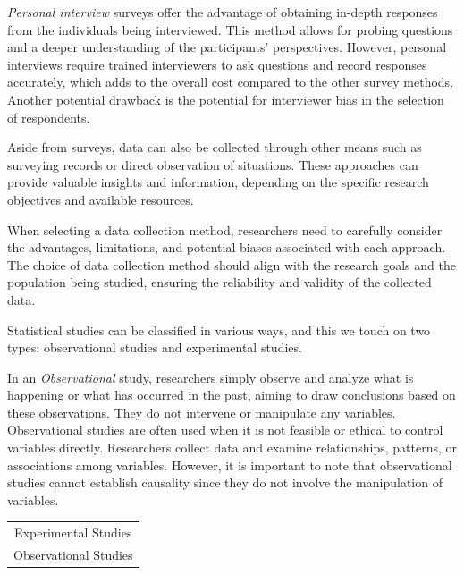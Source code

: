 \documentclass{article}
\begin{document}
\emph{Personal interview} surveys offer the advantage of obtaining in-depth responses from the individuals being interviewed. This method allows for probing questions and a deeper understanding of the participants' perspectives. However, personal interviews require trained interviewers to ask questions and record responses accurately, which adds to the overall cost compared to the other survey methods. Another potential drawback is the potential for interviewer bias in the selection of respondents.

Aside from surveys, data can also be collected through other means such as surveying records or direct observation of situations. These approaches can provide valuable insights and information, depending on the specific research objectives and available resources.

When selecting a data collection method, researchers need to carefully consider the advantages, limitations, and potential biases associated with each approach. The choice of data collection method should align with the research goals and the population being studied, ensuring the reliability and validity of the collected data.

Statistical studies can be classified in various ways, and this we touch on two types: observational studies and experimental studies.

In an \emph{Observational} study, researchers simply observe and analyze what is happening or what has occurred in the past, aiming to draw conclusions based on these observations. They do not intervene or manipulate any variables. Observational studies are often used when it is not feasible or ethical to control variables directly. Researchers collect data and examine relationships, patterns, or associations among variables. However, it is important to note that observational studies cannot establish causality since they do not involve the manipulation of variables.

\begin{margintable}
\begin{tabular}{c} 
    Experimental Studies \\
    Observational Studies
\end{tabular}
\end{margintable}
\end{document}
